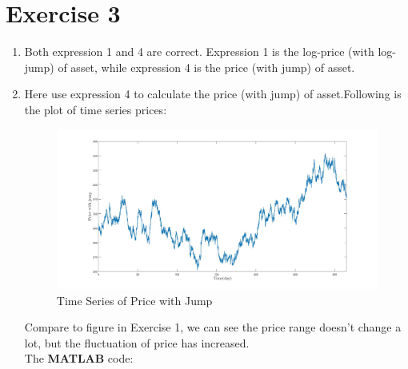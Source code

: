 \documentclass[12pt,letterpaper]{article}
\begin{document}
\section*{Exercise 3}
  \begin{enumerate}[label=\textbf{(\Alph*)}]
  \item Both expression 1 and 4 are correct. Expression 1 is the log-price (with log-jump) of asset, while expression 4 is the price (with jump) of asset.
 	      
\item  Here use expression 4 to calculate the price (with jump) of asset.Following is the plot of time series prices:
        \begin{figure}[H]
            \centering
            \includegraphics[width=15cm]{figures/p1_ex3.jpg}
            \caption{Time Series of Price with Jump}
            \label{fig:3}
        \end{figure}
Compare to figure in Exercise 1, we can see the price range doesn't change a lot, but the fluctuation of price has increased.\\

The \textbf{MATLAB} code:
   
\end{enumerate}
\newpage
\end{document}
